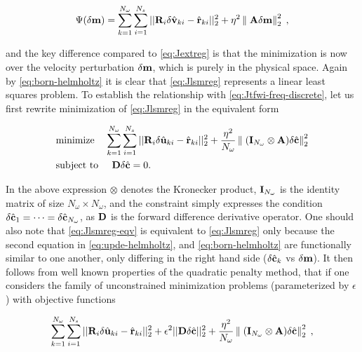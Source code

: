 \vspace*{-0.7cm}
\begin{equation}
\Psi(\delta \mathbf{m}) = \sum_{k=1}^{N_\omega} \sum_{i=1}^{N_s} ||\mathbf{R}_i \delta \hat{\mathbf{v}}_{ki} - \hat{\mathbf{r}}_{ki}||_2^2 + \eta^2 \left\lVert\; \mathbf{A} \delta \mathbf{m} \right\rVert^2_2 \;,
\label{eq:Jlsmreg}
\end{equation}
\vspace*{-0.5cm}

and the key difference compared to \eqref{eq:Jextreg} is that the minimization is now over the velocity perturbation $\delta \mathbf{m}$, which is purely in the physical space. Again by \eqref{eq:born-helmholtz} it is clear that \eqref{eq:Jlsmreg} represents a linear least squares problem. To establish the relationship with \eqref{eq:Jtfwi-freq-discrete}, let us first rewrite minimization of \eqref{eq:Jlsmreg} in the equivalent form

\vspace*{-1.0cm}
\begin{equation}
\begin{split}
& \text{minimize} \;\;\;\; \sum_{k=1}^{N_\omega} \sum_{i=1}^{N_s} ||\mathbf{R}_i \delta \hat{\mathbf{u}}_{ki} - \hat{\mathbf{r}}_{ki}||_2^2 + \frac{\eta^2}{N_\omega} \left\lVert\; (\mathbf{I}_{N_\omega} \otimes \mathbf{A}) \delta \hat{\mathbf{c}} \right\rVert^2_2 \\
& \text{subject to} \;\;\;\;\; \mathbf{D} \delta \hat{\mathbf{c}} = 0.
\end{split}
\label{eq:Jlsmreg-eqv}
\end{equation}
\vspace*{-0.7cm}

In the above expression $\otimes$ denotes the Kronecker product, $\mathbf{I}_{N_\omega}$ is the identity matrix of size $N_\omega \times N_\omega$, and the constraint simply expresses the condition $\delta \hat{\mathbf{c}}_{1} = \dots = \delta \hat{\mathbf{c}}_{N_\omega}$, as $\mathbf{D}$ is the forward difference derivative operator. One should also note that \eqref{eq:Jlsmreg-eqv} is equivalent to \eqref{eq:Jlsmreg} only because the second equation in \eqref{eq:upde-helmholtz}, and \eqref{eq:born-helmholtz} are functionally similar to one another, only differing in the right hand side ($\delta \hat{\mathbf{c}}_{k}$ vs $\delta \mathbf{m}$). It then follows from well known properties of the quadratic penalty method, that if one considers the family of unconstrained minimization problems (parameterized by $\epsilon$) with objective functions

\vspace*{-0.7cm}
\begin{equation}
\sum_{k=1}^{N_\omega} \sum_{i=1}^{N_s} ||\mathbf{R}_i \delta \hat{\mathbf{u}}_{ki} - \hat{\mathbf{r}}_{ki}||_2^2 + \epsilon^2 ||\mathbf{D} \delta \hat{\mathbf{c}}||_2^2 + \frac{\eta^2}{N_\omega} \left\lVert\; (\mathbf{I}_{N_\omega} \otimes \mathbf{A}) \delta \hat{\mathbf{c}} \right\rVert^2_2 \;,
\label{eq:Jlsmreg-eqv-uncons}
\end{equation}
\vspace*{-0.7cm}

